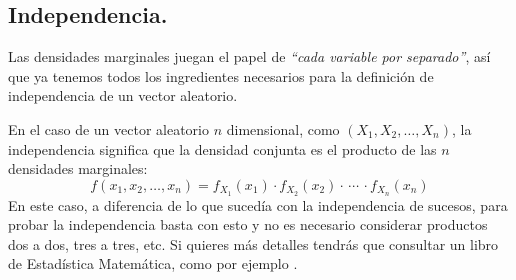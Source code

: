 \subsection{Independencia.}
\label{cap04:subsec:IndependenciaVectorAleatorioDiscreto}

Las densidades marginales juegan el papel de {\em ``cada variable por separado''}, así que ya tenemos todos los ingredientes necesarios para la definición de independencia de un vector aleatorio.

    \begin{center}
    \end{center}
En el caso de un vector aleatorio $n$ dimensional, como $(X_1,X_2,\ldots,X_n)$, la independencia significa que la densidad conjunta es el producto de las $n$ densidades marginales:
\begin{equation}
\label{cap04:ecu:indepedenciaVariablesAleatoriasDiscretasCasoNdimensional}
f(x_1,x_2,\ldots,x_n) = f_{X_1}(x_1)\cdot f_{X_2}(x_2)\cdot\,\cdots\,\cdot f_{X_n}(x_n)
\end{equation}
En este caso, a diferencia de lo que sucedía con la independencia de sucesos, para probar la independencia basta con esto y no es necesario considerar productos dos a dos, tres a tres, etc. Si quieres más detalles tendrás que consultar un libro de Estadística Matemática, como por ejemplo \cite{horra2003estadistica}. 


